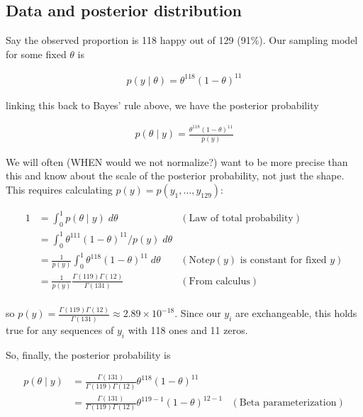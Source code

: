 \documentclass[
]{article}
\begin{document}
\hypertarget{data-and-posterior-distribution}{%
\subsection{Data and posterior
distribution}\label{data-and-posterior-distribution}}

Say the observed proportion is 118 happy out of 129 (91\%). Our sampling
model for some fixed \(\theta\) is

\begin{align}
p(y \mid \theta) = \theta^{118} (1 - \theta)^{11}
\end{align}

linking this back to Bayes' rule above, we have the posterior
probability

\begin{align}
p(\theta \mid y) = \frac{\theta^{118} (1 - \theta)^{11}}{p(y)}
\end{align}

We will often (WHEN would we not normalize?) want to be more precise
than this and know about the scale of the posterior probability, not
just the shape. This requires calculating
\(p(y) = p(y_1, \dots, y_{129})\):

\begin{align}
1 &= \int_0^1 p(\theta \mid y) \; d\theta & (\text{Law of total probability}) \\
&= \int_0^1 \theta^{111} (1 - \theta)^{11} / p(y) \; d\theta \\
&= \frac{1}{p(y)} \int_0^1 \theta^{118} (1 - \theta)^{11} \; d\theta & (\text{Note
$p(y)$ is constant for fixed $y$})\\
&= \frac{1}{p(y)} \frac{\Gamma(119) \Gamma(12)}{\Gamma(131)} & (\text{From calculus})\\
\end{align}

so
\(p(y) = \frac{\Gamma(119) \Gamma(12)}{\Gamma(131)} \approx 2.89 \times 10^{-18}\).
Since our \(y_i\) are exchangeable, this holds true for any sequences of
\(y_i\) with 118 ones and 11 zeros.

So, finally, the posterior probability is

\begin{align}
p(\theta \mid y) &= \frac{\Gamma(131)}{\Gamma(119) \Gamma(12)} \theta^{118} (1 -
\theta)^11 \\
&= \frac{\Gamma(131)}{\Gamma(119) \Gamma(12)} \theta^{119 - 1} (1 - \theta)^{12 - 1} & (\text{Beta parameterization})\\
\end{align}
\end{document}
